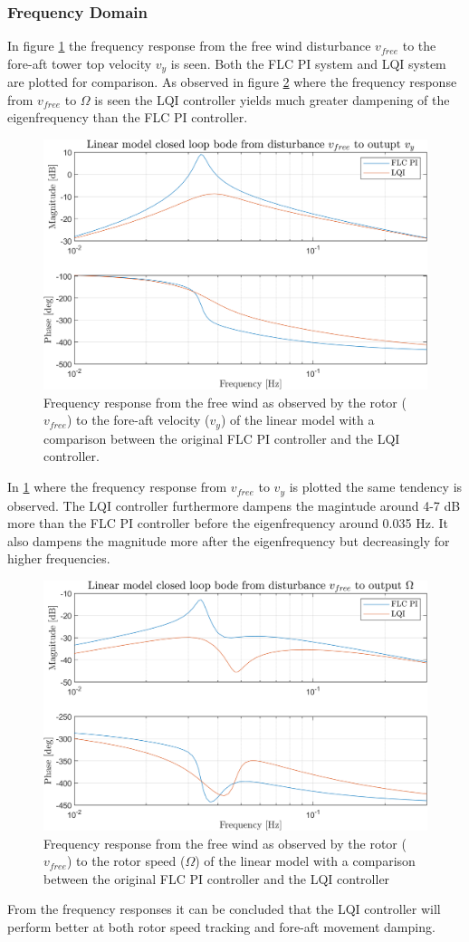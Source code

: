 \subsubsection{Frequency Domain}
In figure \cref{fig:script_vfreeTovy} the frequency response from the free wind disturbance $ v_{free} $ to the fore-aft tower top velocity $ v_y $ is seen. Both the FLC PI system and LQI system are plotted for comparison. As observed in figure \cref{fig:script_vfreeToW} where the frequency response from $ v_{free} $ to $ \Omega $ is seen the LQI controller yields much greater dampening of the eigenfrequency than the FLC PI controller.
\begin{figure}[ht]
	\centering
	\includegraphics[width=0.7\linewidth]{Graphics/TestResults/linearModPerf/script_vfreeTovy.png}
	\caption{Frequency response from the free wind as observed by the rotor ($ v_{free} $) to the fore-aft velocity ($ v_y $) of the linear model with a comparison between the original FLC PI controller and the LQI controller.}
	\label{fig:script_vfreeTovy}
\end{figure}
 In \cref{fig:script_vfreeTovy} where the frequency response from $ v_{free} $ to $ v_y $ is plotted the same tendency is observed. The LQI controller furthermore dampens the magintude around 4-7 dB more than the FLC PI controller before the eigenfrequency around 0.035 Hz. It also dampens the magnitude more after the eigenfrequency but decreasingly for higher frequencies.
\begin{figure}[ht]
	\centering
	\includegraphics[width=0.7\linewidth]{Graphics/TestResults/linearModPerf/script_vfreeToW.png}
	\caption{Frequency response from the free wind as observed by the rotor ($ v_{free} $) to the rotor speed ($ \Omega $) of the linear model with a comparison between the original FLC PI controller and the LQI controller}
	\label{fig:script_vfreeToW}
\end{figure}
From the frequency responses it can be concluded that the LQI controller will perform better at both rotor speed tracking and fore-aft movement damping. 

